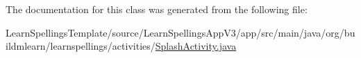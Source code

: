The documentation for this class was generated from the following file\+:\begin{DoxyCompactItemize}
\item 
Learn\+Spellings\+Template/source/\+Learn\+Spellings\+App\+V3/app/src/main/java/org/buildmlearn/learnspellings/activities/\hyperlink{LearnSpellingsTemplate_2source_2LearnSpellingsAppV3_2app_2src_2main_2java_2org_2buildmlearn_2lea263cf1df93c4911292d418c475d08eab}{Splash\+Activity.\+java}\end{DoxyCompactItemize}
